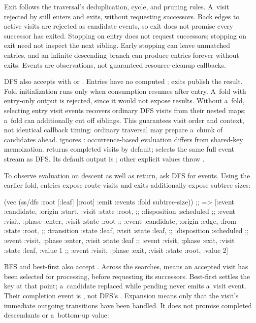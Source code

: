 {Exit follows the traversal's deduplication, cycle, and pruning rules.
A~visit rejected by  still enters and exits, without
requesting successors. Back edges to active visits are rejected as candidate
events, so exit
does not promise every successor has exited.
Stopping on entry does not request successors; stopping on exit need not
inspect the next sibling. Early stopping can leave unmatched entries, and
an infinite descending branch can produce entries forever without exits.
Events are observations, not guaranteed resource-cleanup callbacks.

DFS also accepts  with  or
. Entries have no computed ; exits publish
the result. Fold initialization runs only when consumption resumes after
entry. A~fold with entry-only output is rejected, since it would not expose
results. Without a~fold, selecting entry visit events recovers ordinary DFS visits
from their nested  maps; a~fold can additionally cut off siblings.
This guarantees visit order and context, not identical callback timing:
ordinary traversal may prepare a~chunk of candidates ahead.
 ignores : occurrence-based evaluation
differs from shared-key memoization.
 returns completed visits by default; 
selects the same full event stream as DFS. Its default output is ;
other explicit  values throw .

To observe evaluation on descent as well as return, ask DFS for events.
Using the earlier  fold, entries expose route visits
and exits additionally expose subtree sizes:

\begtt {}
(vec (ss/dfs {:root [:leaf]} [:root]
            {:emit :events :fold subtree-size}))
;; => [{:event :candidate, :origin :start, :visit {:state :root},
;;      :disposition :scheduled}
;;     {:event :visit, :phase :enter, :visit {:state :root}}
;;     {:event :candidate, :origin :edge, :from {:state :root},
;;      :transition {:state :leaf}, :visit {:state :leaf},
;;      :disposition :scheduled}
;;     {:event :visit, :phase :enter, :visit {:state :leaf}}
;;     {:event :visit, :phase :exit, :visit {:state :leaf, :value 1}}
;;     {:event :visit, :phase :exit, :visit {:state :root, :value 2}}]
\endtt

BFS and best-first also accept . Across the searches,
 means an accepted visit has been selected for
processing, before requesting its successors. Best-first settles the key
at that point; a~candidate replaced while pending never emits a~visit event.
Their completion event is , not DFS's
. Expansion means only that the visit's immediate
outgoing transitions have been handled. It does not promise completed
descendants or a~bottom-up value:

}
